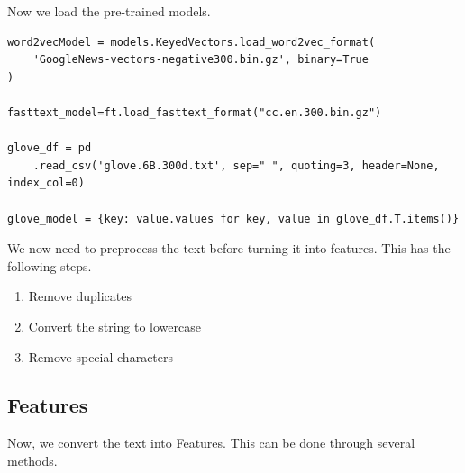 \documentclass{article}
\begin{document}
Now we load the pre-trained models.

\begin{lstlisting}
word2vecModel = models.KeyedVectors.load_word2vec_format(
    'GoogleNews-vectors-negative300.bin.gz', binary=True
)

fasttext_model=ft.load_fasttext_format("cc.en.300.bin.gz")

glove_df = pd
    .read_csv('glove.6B.300d.txt', sep=" ", quoting=3, header=None, index_col=0)

glove_model = {key: value.values for key, value in glove_df.T.items()}
\end{lstlisting}

\medskip

We now need to preprocess the text before turning it into features. This has the following steps.

\begin{enumerate}
    \item{Remove duplicates}
    \item{Convert the string to lowercase}
    \item{Remove special characters}
\end{enumerate}

\subsection{Features}

Now, we convert the text into Features. This can be done through several methods.
\end{document}
